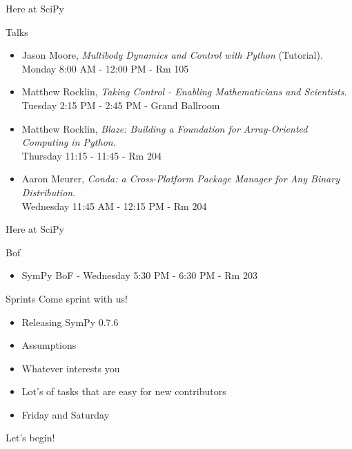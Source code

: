 \documentclass[xcolor=svgnames]{beamer}
\begin{document}
\begin{frame}{Here at SciPy}
  \begin{block}{Talks}
    \begin{itemize}
    \item \normalsize Jason Moore, \textit{Multibody Dynamics and Control with Python}
      (Tutorial). \\ \footnotesize Monday 8:00 AM - 12:00 PM - Rm 105
    \item \normalsize Matthew Rocklin, \textit{Taking Control - Enabling Mathematicians and Scientists}. \\ \footnotesize Tuesday 2:15
      PM - 2:45 PM - Grand Ballroom
    \item \normalsize Matthew Rocklin, \textit{Blaze: Building a Foundation
      for Array-Oriented Computing in Python}. \\ \footnotesize Thursday 11:15
      - 11:45 - Rm 204
    \item \normalsize Aaron Meurer, \textit{Conda: a Cross-Platform Package Manager for Any Binary Distribution}. \\
      \footnotesize Wednesday 11:45 AM - 12:15 PM - Rm 204
    \end{itemize}
  \end{block}
\end{frame}

\begin{frame}{Here at SciPy}
  \begin{block}{Bof}
    \begin{itemize}
      \item SymPy BoF - Wednesday 5:30 PM - 6:30 PM - Rm 203
    \end{itemize}
  \end{block}
  \begin{block}{Sprints}
    Come sprint with us!
    \begin{itemize}
    \item Releasing SymPy 0.7.6
    \item Assumptions
    \item Whatever interests you
    \item Lot's of tasks that are easy for new contributors
    \item Friday and Saturday
    \end{itemize}
  \end{block}
\end{frame}

\begin{frame}
\Huge Let's begin!
\end{frame}
\end{document}

